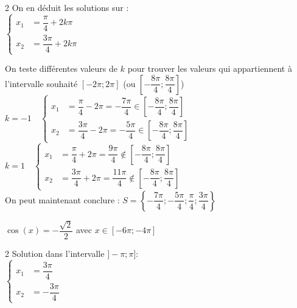 \documentclass[11pt,a4paper]{article}  %
\begin{document}
\begin{enumMet}
\begin{corrBox}
\begin{multicols}{2}
			\columnbreak
			On en déduit les solutions sur \R:\\
			$\begin{cases}
				x_1 &=\dfrac{\pi}{4}+2k\pi\\
				x_2 &=\dfrac{3\pi}{4}+2k\pi\
			\end{cases}$\\
		\end{multicols}
		On teste différentes valeurs de $k$ pour trouver les valeurs qui appartiennent à l'intervalle souhaité $\left[-2\pi;2\pi\right]$ (ou $\left[-\dfrac{8\pi}{4};\dfrac{8\pi}{4}\right]$)\\
		$k=-1\quad \begin{cases}
			x_1 &=\dfrac{\pi}{4}-2\pi=-\dfrac{7\pi}{4}\in\left[-\dfrac{8\pi}{4};\dfrac{8\pi}{4}\right]\\
			x_2 &=\dfrac{3\pi}{4}-2\pi=-\dfrac{5\pi}{4}\in\left[-\dfrac{8\pi}{4};\dfrac{8\pi}{4}\right]
		\end{cases}$\\
		$k=1\quad \begin{cases}
			x_1 &=\dfrac{\pi}{4}+2\pi=\dfrac{9\pi}{4}\notin\left[-\dfrac{8\pi}{4};\dfrac{8\pi}{4}\right]\\
			x_2 &=\dfrac{3\pi}{4}+2\pi=\dfrac{11\pi}{4}\notin\left[-\dfrac{8\pi}{4};\dfrac{8\pi}{4}\right]
		\end{cases}$\\
		On peut maintenant conclure : $S=\left\{-\dfrac{7\pi}{4};-\dfrac{5\pi}{4};\dfrac{\pi}{4};\dfrac{3\pi}{4}\right\}$
	\end{corrBox}
	\item {} $\cos(x)=-\dfrac{\sqrt{2}}{2}$ avec $x\in \left[-6\pi;-4\pi\right]$\\
	\begin{corrBox}
		\begin{multicols}{2}
			Solution dans l'intervalle $]-\pi;\pi]$:\\
			$\begin{cases}
				x_1 &=\dfrac{3\pi}{4}\\
				x_2 &=-\dfrac{3\pi}{4}
			\end{cases}$\\
			

\end{multicols}
\end{corrBox}
\end{enumMet}
\end{document}
